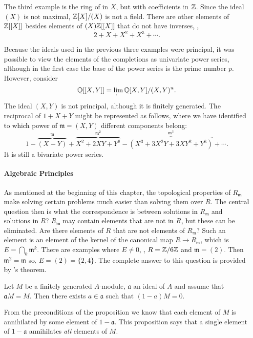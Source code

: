 The third example is the ring of  in $X$, but with
coefficients in $\mathbb{Z}$.  Since the ideal $(X)$ is not maximal,
$\mathbb{Z}[X]/(X)$ is not a field.  There are other elements of $\mathbb{Z}[[X]]$
besides elements of $(X) \mathbb{Z}[[X]]$ that do not have inverses, \eg,
\[
2 + X + X^2 + X^3 + \cdots.
\]

Because the ideals used in the previous three examples were principal,
it was possible to view the elements of the completions as univariate
power series, although in the first case the base of the power series
is the prime number $p$.  However, consider
\[
\mathbb{Q}[[X, Y]] = \displaystyle \lim_{\leftarrow} \mathbb{Q}[X, Y]/(X, Y)^n.
\]
The ideal $(X, Y)$ is not principal, although it is finitely
generated.  The reciprocal of $1 + X + Y$ might be represented as
follows, where we have identified to which power of $\mathfrak{m} = (X,
Y)$ different components belong:
\[
1 - \overbrace{(X+Y)}^\mathfrak{m} 
  + \overbrace{X^2+2XY+ Y^2}^{\mathfrak{m}^2} 
  - \overbrace{(X^3+3X^2Y+ 3X Y^2 + Y^3)}^{\mathfrak{m}^3} + \cdots.
\]
It is still a bivariate power series.

\paragraph{Algebraic Principles}
As mentioned at the beginning of this chapter, the topological
properties of $R_\mathfrak{m}$ make solving certain problems much
easier than solving them over $R$.  The central question then is what
the correspondence is between solutions in $R_\mathfrak{m}$ and
solutions in $R$?  $R_\mathfrak{m}$ may contain elements that are not
in $R$, but these can be eliminated.  Are there elements of $R$ that
are not elements of $R_\mathfrak{m}$?  Such an element is an element
of the kernel of the canonical map $R \rightarrow R_\mathfrak{m}$,
which is $E = \bigcap_k \mathfrak{m}^k$.  There are examples where $E
\not= 0$, \eg, $R = \mathbb{Z}/6\mathbb{Z}$ and $\mathfrak{m} = (2)$.  Then
$\mathfrak{m}^2 = \mathfrak{m}$ so, $E = (2) = \{2, 4 \}$.  The
complete answer to this question is provided by {\Krull}'s
theorem.


\begin{proposition}
  Let $M$ be a finitely generated $A$-module, $\mathfrak{a}$ an ideal
  of $A$ and assume that $\mathfrak{a} M = M$.  Then there exists $a
  \in \mathfrak{a}$ such that $(1 - a)M = 0$.
\end{proposition}

From the preconditions of the proposition we know that each element of
$M$ is annihilated by some element of $1 - \mathfrak{a}$.  This
proposition says that a single element of $1 - \mathfrak{a}$
annihilates {\em all} elements of $M$.

